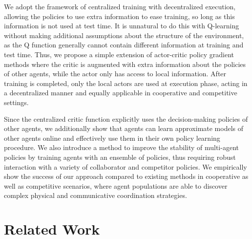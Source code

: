 \documentclass{article}
\newcommand{\comment}[1]{\textbf{\textcolor{red}{comment: #1}}}
\begin{document}
We adopt the framework of centralized training with decentralized execution, allowing the policies to use extra information to ease training, so long as this information is not used at test time. It is unnatural to do this with Q-learning without making additional assumptions about the structure of the environment, as the Q function generally cannot contain different information at training and test time. Thus, we propose a simple extension of actor-critic policy gradient methods where the critic is augmented with extra information about the policies of other agents, while the actor only has access to local information. After training is completed, only the local actors are used at execution phase, acting in a decentralized manner and equally applicable in cooperative and competitive settings.

Since the centralized critic function explicitly uses the decision-making policies of other agents, we additionally show that agents can learn approximate models of other agents online and effectively use them in their own policy learning procedure. We also introduce a method to improve the stability of multi-agent policies by training agents with an ensemble of policies, thus requiring robust interaction with a variety of collaborator and competitor policies. 
We empirically show the success of our approach compared to existing methods in cooperative as well as competitive scenarios, where agent populations are able to discover complex physical and communicative coordination strategies.

\section{Related Work}
\vspace{-2mm}
\end{document}

